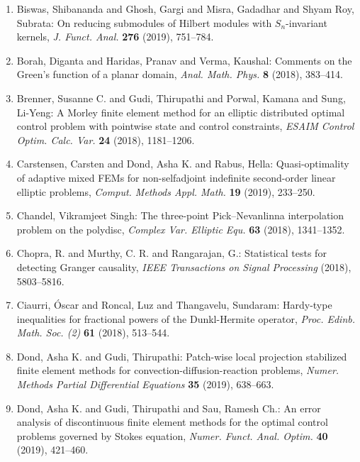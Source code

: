 \begin{enumerate}[leftmargin=27pt]
	\item\label{Misra:symm-polydisc} Biswas, Shibananda and Ghosh, Gargi and Misra, Gadadhar and
	      Shyam Roy, Subrata: On reducing submodules
	      of {H}ilbert modules with {${S}_n$}-invariant kernels, {\em J. Funct. Anal.} {\bf 276} (2019), 751--784.

	\item Borah, Diganta and Haridas, Pranav and Verma, Kaushal: Comments on the {G}reen's function of a
	      planar domain, {\em Anal. Math. Phys.} {\bf 8} (2018), 383--414.

	\item Brenner, Susanne C. and Gudi, Thirupathi and Porwal, Kamana
	      and Sung, Li-Yeng: A {M}orley finite element method for an elliptic distributed
	      optimal control problem with pointwise state and control
	      constraints, {\em ESAIM Control Optim. Calc. Var.} {\bf 24} (2018), 1181--1206.

	\item Carstensen, Carsten and Dond, Asha K. and Rabus, Hella: Quasi-optimality of adaptive mixed {FEM}s for non-selfadjoint
	      indefinite second-order linear elliptic problems, {\em Comput. Methods Appl. Math.} {\bf 19} (2019), 233--250.

	\item Chandel, Vikramjeet Singh: The three-point {P}ick--{N}evanlinna interpolation problem on
	      the polydisc, {\em Complex Var. Elliptic Equ.} {\bf 63} (2018), 1341--1352.

	\item\label{rangarajan:Granger-causality} Chopra, R. and Murthy, C. R. and Rangarajan, G.: Statistical tests for detecting Granger causality, {\em IEEE Transactions on Signal Processing} {\bf } (2018), 5803--5816.

	\item Ciaurri, \'{O}scar and Roncal, Luz and Thangavelu, Sundaram: Hardy-type inequalities for fractional powers
	      of the {D}unkl-{H}ermite operator, {\em Proc. Edinb. Math. Soc. (2)} {\bf 61} (2018), 513--544.

	\item Dond, Asha K. and Gudi, Thirupathi: Patch-wise local projection stabilized finite element methods
	      for convection-diffusion-reaction problems, {\em Numer. Methods Partial Differential Equations}
		      {\bf 35} (2019), 638--663.

	\item Dond, Asha K. and Gudi, Thirupathi and Sau, Ramesh Ch.: An error analysis of discontinuous finite element
	      methods for the optimal control problems governed by {S}tokes equation, {\em Numer. Funct. Anal. Optim.}
		      {\bf 40} (2019), 421--460.


\end{enumerate}
